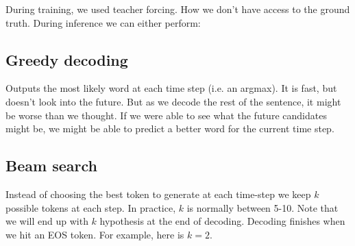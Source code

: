 \documentclass[11pt]{article}
\begin{document}
During training, we used teacher forcing. How we don't have access to the ground truth. During inference we can either perform:

\subsection{Greedy decoding}

Outputs the most likely word at each time step (i.e. an argmax). It is fast, but doesn't look into the future. But as we decode the rest of the sentence, it might be worse than we thought. If we were able to see what the future candidates might be, we might be able to predict a better word for the current time step.

\begin{figure}[H]
    \centering
\end{figure}

\subsection{Beam search}

Instead of choosing the best token to generate at each time-step we keep $k$ possible tokens at each step. In practice, $k$ is normally between 5-10. Note that we will end up with $k$ hypothesis at the end of decoding. Decoding finishes when we hit an EOS token. For example, here is $k=2$.
\end{document}
